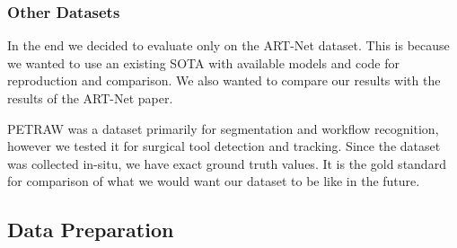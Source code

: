 



\subsubsection{Other Datasets}


In the end we decided to evaluate only on the ART-Net dataset. This is because we wanted to use an existing SOTA with available models and code for reproduction and comparison. We also wanted to compare our results with the results of the ART-Net paper.

PETRAW was a dataset primarily for segmentation and workflow recognition, however we tested it for surgical tool detection and tracking. Since the dataset was collected in-situ, we have exact ground truth values. It is the gold standard for comparison of what we would want our dataset to be like in the future.



\subsection{Data Preparation}








